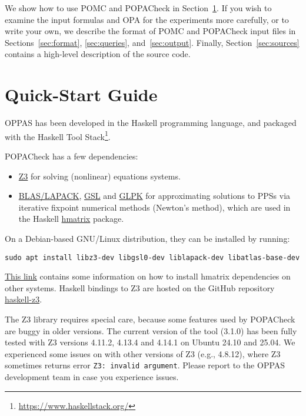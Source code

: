 \documentclass[9pt,a4paper]{article}
\begin{document}
We show how to use POMC and POPACheck in Section~\ref{sec:quick-start}.
If you wish to examine the input formulas and OPA for the experiments more carefully,
or to write your own, we describe the format of POMC and POPACheck input files in Sections~\ref{sec:format}, \ref{sec:queries}, and~\ref{sec:output}.
Finally, Section~\ref{sec:sources} contains a high-level description of the source code.


\section{Quick-Start Guide}
\label{sec:quick-start}

OPPAS has been developed in the Haskell programming language,
and packaged with the Haskell Tool Stack\footnote{\url{https://www.haskellstack.org/}}.

POPACheck has a few dependencies:
\begin{itemize}
    \item \href{https://microsoft.github.io/z3guide/z3}{Z3} for solving (nonlinear) equations systems.
    \item \href{https://www.netlib.org/lapack/}{BLAS/LAPACK}, \href{ttps://www.gnu.org/software/gsl/}{GSL} and \href{https://www.gnu.org/software/glpk/}{GLPK} for approximating solutions to PPSs via iterative fixpoint numerical methods (Newton's method), which are used in the Haskell \href{https://hackage.haskell.org/package/hmatrix}{hmatrix} package.
\end{itemize}
On a Debian-based GNU/Linux distribution, they can be installed by running:
\begin{verbatim}
sudo apt install libz3-dev libgsl0-dev liblapack-dev libatlas-base-dev
\end{verbatim}

\href{https://github.com/haskell-numerics/hmatrix/blob/master/INSTALL.md}{This link} contains some information on how to install hmatrix dependencies on other systems.
Haskell bindings to Z3 are hosted on the GitHub repository \href{https://github.com/michiari/haskell-z3}{haskell-z3}.

The Z3 library requires special care, because some features used by POPACheck are buggy in older versions.
The current version of the tool (3.1.0) has been fully tested with Z3 versions 4.11.2, 4.13.4 and 4.14.1 on Ubuntu 24.10 and 25.04.
We experienced some issues on with other versions of Z3 (e.g., 4.8.12), where Z3 sometimes returns error \verb|Z3: invalid argument|.
Please report to the OPPAS development team in case you experience issues.
\end{document}
